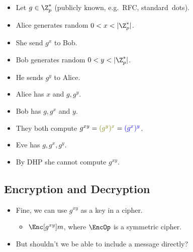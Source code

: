 \begin{frame}
  \begin{definition}
    \begin{itemize}
      \item Let \(g\in \Z_p^*\) (publicly known, e.g.\ RFC, standard\ dots).

        \pause{}

      \color{green!50!red}
      \item Alice generates random \(0 < x < |\Z_p^*|\).
      \item She send \(g^x\) to Bob.

        \pause{}

      \color{blue}
      \item Bob generates random \(0 < y < |\Z_p^*|\).
      \item He sends \(g^y\) to Alice.

        \pause{}

      \color{green!50!red}
      \item Alice has \(x\) and \(g, g^y\).
      \color{blue}
      \item Bob has \(g, g^x\) and \(y\).
      \color{black}
      \item They both compute \(g^{xy} = {\color{green!50!red} (g^y)^x} 
          = {\color{blue} (g^x)^y}\).

        \pause{}

      \color{red}
      \item Eve has \(g, g^x, g^y\).
      \item By \ac{DHP} she cannot compute \(g^{xy}\).
    \end{itemize}
  \end{definition}
\end{frame}

\subsection{Encryption and Decryption}

\begin{frame}
  \begin{idea}
    \begin{itemize}
      \item Fine, we can use \(g^{xy}\) as a key in a cipher.
        \begin{itemize}
          \item \(\Enc[g^{xy}]{m}\), where \(\EncOp\) is a symmetric cipher.
        \end{itemize}
      \item But shouldn't we be able to include a message directly?
    \end{itemize}
  \end{idea}
\end{frame}

